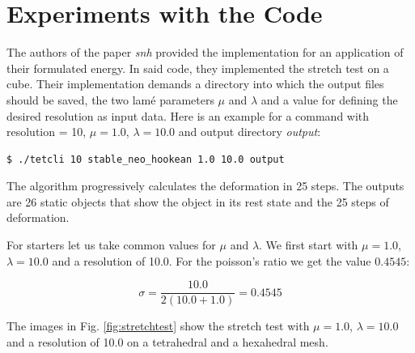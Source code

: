 


\section{Experiments with the Code}
The authors of the paper \textit{\acrshort{snh}} provided the implementation for an application of their formulated energy. In said code, they implemented the stretch test on a cube. Their implementation demands a directory into which the output files should be saved, the two lamé parameters $\mu$ and $\lambda$ and a value for defining the desired resolution as input data. Here is an example for a command with resolution = 10, $\mu=1.0$, $\lambda=10.0$ and output directory \textit{output}:
\begin{lstlisting}[language=bash]
$ ./tetcli 10 stable_neo_hookean 1.0 10.0 output
\end{lstlisting}

The algorithm progressively calculates the deformation in 25 steps. The outputs are 26 static objects that show the object in its rest state and the 25 steps of deformation.



For starters let us take common values for $\mu$ and $\lambda$. We first start with $\mu = 1.0$, $\lambda = 10.0$ and a resolution of 10.0. For the poisson's ratio we get the value $0.4545$:

\[ \sigma =  \frac{10.0}{2 (10.0 + 1.0)} = 0.4545 \]


The images in Fig. \ref{fig:stretchtest} show the stretch test with $\mu = 1.0$, $\lambda = 10.0$ and a resolution of 10.0 on a tetrahedral and a hexahedral mesh.

